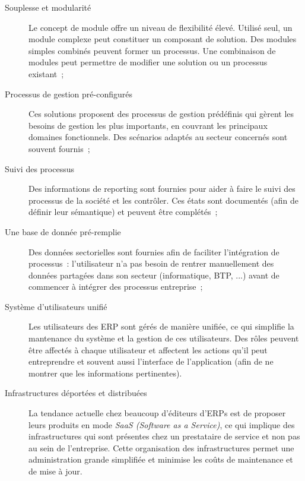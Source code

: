         \begin{description}

            \item[Souplesse et modularité] Le concept de module offre un niveau de flexibilité élevé. Utilisé seul, un module complexe peut constituer un composant de solution. Des modules simples combinés peuvent former un processus. Une combinaison de modules peut permettre de modifier une solution ou un processus existant~;

            \item[Processus de gestion pré-configurés] Ces solutions proposent des processus de gestion prédéfinis qui gèrent les besoins de gestion les plus importants, en couvrant les principaux domaines fonctionnels. Des scénarios adaptés au secteur concernés sont souvent fournis~;

            \item[Suivi des processus] Des informations de reporting sont fournies pour aider à faire le suivi des processus de la société et les contrôler. Ces états sont documentés (afin de définir leur sémantique) et peuvent être complétés~;

            \item[Une base de donnée pré-remplie] Des données sectorielles sont fournies afin de faciliter l'intégration de processus~: l'utilisateur n'a pas besoin de rentrer manuellement des données partagées dans son secteur (informatique, BTP, ...) avant de commencer à intégrer des processus entreprise~;

            \item[Système d'utilisateurs unifié] Les utilisateurs des ERP sont gérés de manière unifiée, ce qui simplifie la mantenance du système et la gestion de ces utilisateurs. Des rôles peuvent être affectés à chaque utilisateur et affectent les actions qu'il peut entreprendre et souvent aussi l'interface de l'application (afin de ne montrer que les informations pertinentes).

            \item[Infrastructures déportées et distribuées] La tendance actuelle chez beaucoup d'éditeurs d'ERPs est de proposer leurs produits en mode \textit{SaaS (Software as a Service)}, ce qui implique des infrastructures qui sont présentes chez un prestataire de service et non pas au sein de l'entreprise. Cette organisation des infrastructures permet une administration grande simplifiée et minimise les coûts de maintenance et de mise à jour.

        \end{description}
